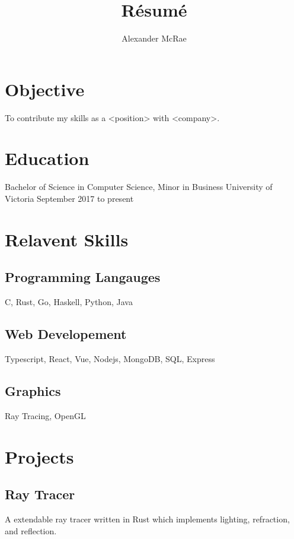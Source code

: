 \documentclass{article}
\renewcommand{\maketitle}{
    \begin{center}
        
\theauthor
    \end{center}
}
\begin{document}
\title{R\'esum\'e}
\author{Alexander McRae}

\maketitle

\section{Objective}

To contribute my skills as a <position> with <company>.

\section{Education}

Bachelor of Science in Computer Science, Minor in Business
University of Victoria
September 2017 to present

\section{Relavent Skills}

\subsection{Programming Langauges}

C, Rust, Go, Haskell, Python, Java

\subsection{Web Developement}

Typescript, React, Vue, Nodejs, MongoDB, SQL, Express

\subsection{Graphics}

Ray Tracing, OpenGL

\section{Projects}

\subsection{Ray Tracer}

A extendable ray tracer written in Rust which implements lighting,
refraction, and reflection.
\end{document}
